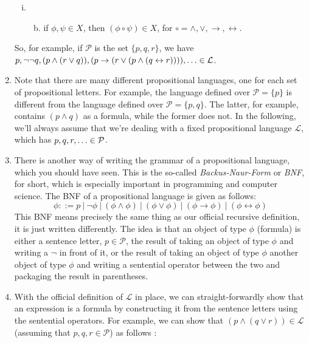 \begin{enumerate}[\thesection.1]
\begin{enumerate}[(i)]
			\item \begin{enumerate}[(a)]
		\setcounter{enumiii}{1}
					
					\item if $\phi,\psi\in X$, then $(\phi\circ\psi)\in X$, for $\circ=\land,\lor,\to,\leftrightarrow$.
		
				\end{enumerate}		
		
		\end{enumerate}
So, for example, if $\mathcal{P}$ is the set $\{p,q,r\}$, we have $p, \neg\neg q, (p\land (r\lor q)), (p\to (r\lor (p\land (q\leftrightarrow r)))), \mathellipsis\in\mathcal{L}$.	

	\item Note that there are many different propositional languages, one for each set of propositional letters. For example, the language defined over $\mathcal{P}=\{p\}$ is different from the language defined over $\mathcal{P}=\{p,q\}$. The latter, for example, contains $(p\land q)$ as a formula, while the former does not. In the following, we'll always assume that we're dealing with a fixed propositional language $\mathcal{L}$, which has $p,q,r,\mathellipsis\in\mathcal{P}$.

	\item There is another way of writing the grammar of a propositional language, which you should have seen. This is the so-called \emph{Backus-Naur-Form} or \emph{BNF}, for short, which is especially important in programming and computer science. The BNF of a propositional language is given as follows:
	\[\phi::=p~|~\neg \phi~|~(\phi\land\phi)~|~(\phi\lor\phi)~|~(\phi\to\phi)~|~(\phi\leftrightarrow\phi)\]
This BNF means precisely the same thing as our official recursive definition, it is just written differently. The idea is that an object of type $\phi$ (formula) is either a sentence letter, $p\in\mathcal{P}$, the result of taking an object of type $\phi$ and writing a $\neg$ in front of it, or the result of taking an object of type $\phi$ another object of type $\phi$ and writing a sentential operator between the two and packaging the result in parentheses.
	
	\item With the official definition of $\mathcal{L}$ in place, we can straight-forwardly show that an expression is a formula by constructing it from the sentence letters using the sentential operators. For example, we can show that $(p\land (q\lor r))\in\mathcal{L}$ (assuming that $p,q,r\in\mathcal{P}$) as follows :
	\begin{itemize}
	

\end{itemize}
\end{enumerate}
